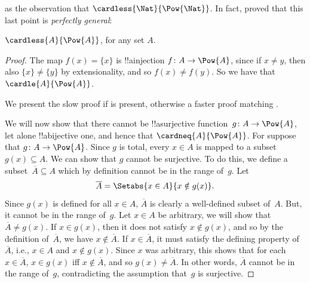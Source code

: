 as the observation that
$\cardless{\Nat}{\Pow{\Nat}}$. In fact,
\citet{Cantor1892} proved that this last point is \emph{perfectly
general}:

\begin{thm}[Cantor]
$\cardless{A}{\Pow{A}}$, for any set $A$.
\end{thm}

\begin{proof}
The map $f(x) = \{x\}$ is !!a{injection} $f \colon A \to \Pow{A}$,
since if $x \neq y$, then also $\{x\} \neq \{y\}$ by extensionality,
and so $f(x) \neq f(y)$. So we have that $\cardle{A}{\Pow{A}}$. 

\begin{editorial}
We present the slow proof if  is
present, otherwise a faster proof matching .
\end{editorial}


  We will now show that there cannot be !!a{surjective} function~$g\colon A \to
  \Pow{A}$, let alone !!a{bijective} one, and hence that
  $\cardneq{A}{\Pow{A}}$. For suppose that $g\colon A \to \Pow{A}$.
  Since $g$ is total, every $x \in A$ is mapped to a subset $g(x)
  \subseteq A$. We can show that $g$ cannot be surjective. To do this, we
  define a subset~$\overline{A} \subseteq A$ which by definition cannot be in the
  range of~$g$. Let
  \[
  \overline{A} = \Setabs{x \in A}{x \notin g(x)}.
  \]
  Since $g(x)$ is defined for all $x \in A$, $\overline{A}$ is clearly
  a well-defined subset of~$A$.  But, it cannot be in the range
  of~$g$. Let $x \in A$ be arbitrary, we will show that $\overline{A} \neq
  g(x)$.  If $x \in g(x)$, then it does not satisfy $x \notin g(x)$,
  and so by the definition of~$\overline{A}$, we have $x \notin
  \overline{A}$.  If $x \in \overline{A}$, it must satisfy the
  defining property of~$\overline{A}$, i.e., $x \in A$ and $x \notin
  g(x)$. Since $x$ was arbitrary, this shows that for each $x \in
  \overline{A}$, $x \in g(x)$ iff $x \notin \overline{A}$, and so
  $g(x) \neq \overline{A}$.  In other words, $\overline{A}$ cannot be
  in the range of~$g$, contradicting the assumption that~$g$ is
  surjective.{}
\end{proof}


